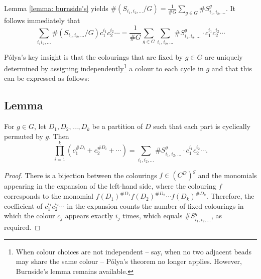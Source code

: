 \documentclass[a4paper,11pt]{article}
\numberwithin{equation}{section}
\begin{document}
    Lemma \ref{lemma: burnside's} yields $\# (S_{i_{1}, i_{2}, \dots}/G)=\frac{1}{\#G}\sum_{g\in G}\#S_{i_{1}, i_{2}, \dots}^g$. It follows immediately that
    \begin{equation}
    \sum_{i_{1} i_{2}, \dots} \#(S_{i_{1}, i_{2}, \dots} / G)  c_1^{i_1}c_{2}^{i_2}\cdots =\frac{1}{\#G}\sum_{g\in G}\sum_{i_{1}, i_{2}, \dots}\#S_{i_{1}, i_{2}, \dots}^g \cdot c_{1}^{i_{1}}c_{2}^{i_{2}}\cdots \label{eq: burnside_on_colourings} 
    \end{equation}

    Pólya’s key insight is that the colourings that are fixed by $g\in G$ are uniquely determined by assigning independently\footnote{When colour choices are not independent -- say, when no two adjacent beads may share the same colour -- Pólya’s theorem no longer applies.  However, Burnside’s lemma remains available.} a colour to each cycle in $g$ and that this can be expressed as follows: 
    
    \subsection{Lemma} \label{lemma: main} For $g\in G$, let $D_{1}, D_{2}, \dots, D_{k}$ be a partition of $D$ such that each part is cyclically permuted by $g$. Then 
    \begin{equation}
        \prod_{i=1}^{k} ( c_{1}^{\#D_{i}} + c_{2}^{\#D_{i}} + \cdots ) = \sum_{i_{1}, i_{2}, \dots} \#S_{i_{1},i_{2},\dots}^{g}\cdot c_{1}^{i_{1}}c_{2}^{i_{2}}\cdots .\label{eq: main_lemma} 
    \end{equation}

    \begin{proof} There is a bijection between the colourings $f\in (C^D)^g$ and the monomials appearing in the expansion of the left-hand side, where the colouring $f$ corresponds to the monomial $f(D_{1})^{\#D_{1}}f(D_{2})^{\#D_{2}}\cdots f(D_{k})^{\# D_{k}}$.  Therefore, the coefficient of \( c_1^{i_1}c_2^{i_2}\cdots \) in the expansion counts the number of fixed colourings in which the colour \( c_j \) appears exactly \( i_j \) times, which equals \( \#S_{i_1, i_2, \dots}^{g} \), as required.
    \end{proof}
\end{document}
